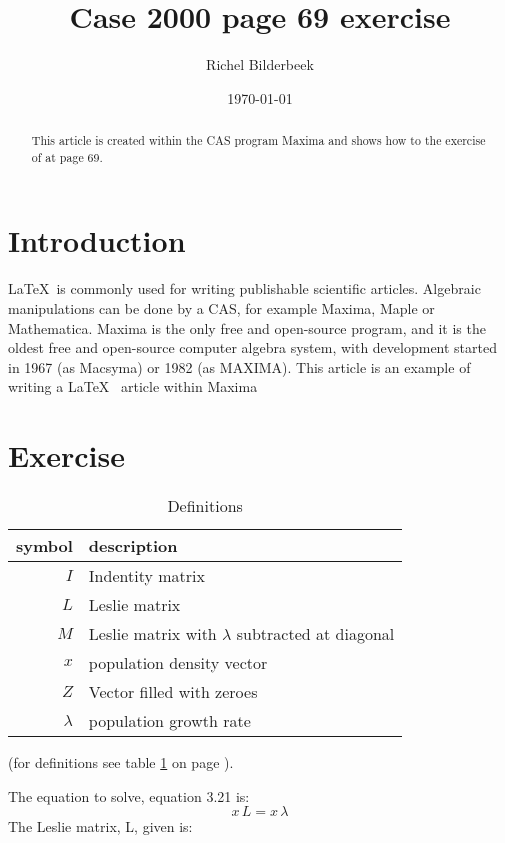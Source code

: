 \documentclass{article}
\title{Case 2000 page 69 exercise}
\author{Richel Bilderbeek}
\date{\today}
\begin{document}
\maketitle

\begin{abstract}
This article is created within the CAS program Maxima
and shows how to the exercise of \cite{case2000} at page 69.
\end{abstract}

\section{Introduction}

\LaTeX~is commonly used for writing publishable scientific articles\cite{gaudeul2006}.
Algebraic manipulations can be done by a CAS, for example Maxima, Maple or Mathematica.
Maxima is the only free and open-source program, and it is the oldest free and open-source computer algebra system, with development started in 1967 (as Macsyma) or 1982 (as MAXIMA).
This article is an example of writing a \LaTeX~ article within Maxima

\section{Exercise}

\begin{table}[here]
  \centering
  \begin{tabular}{ | r | l | }
    \hline
    symbol & description \\
    \hline
    $I$ & Indentity matrix \\
    $L$ & Leslie matrix \\
    $M$ & Leslie matrix with $\lambda$ subtracted at diagonal \\
    $x$ & population density vector \\
    $Z$ & Vector filled with zeroes \\
    $\lambda$ & population growth rate \\
    \hline
  \end{tabular}
  \caption{Definitions}
  \label{table:table_definition}
\end{table}

(for definitions see table \ref{table:table_definition} on page \pageref{table:table_definition}).

The equation to solve, equation 3.21 is:
\begin{equation}
x\,L=x\,\lambda\end{equation}
The Leslie matrix, L,  given is:
\end{document}
